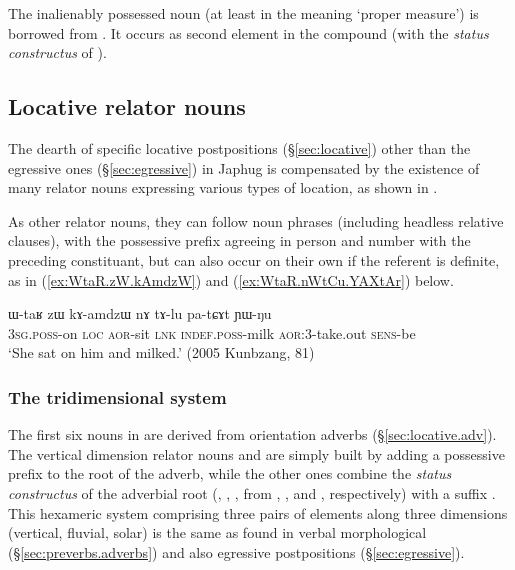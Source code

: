 The inalienably possessed noun   (at least in the meaning `proper measure') is borrowed from . It occurs as second element in the compound (with the \textit{status constructus}  of ).

\subsection{Locative relator nouns} \label{sec:relator.location}
The dearth of specific locative postpositions (§\ref{sec:locative}) other than the egressive ones (§\ref{sec:egressive}) in Japhug is compensated by the existence of many relator nouns expressing various types of location, as shown in . 

As other relator nouns, they can follow noun phrases (including headless relative clauses), with the possessive prefix agreeing in person and number with the preceding constituant, but can also occur on their own if the referent is definite, as  in (\ref{ex:WtaR.zW.kAmdzW}) and (\ref{ex:WtaR.nWtCu.YAXtAr}) below.

\begin{exe}
\ex \label{ex:WtaR.zW.kAmdzW}
\gll  ɯ-taʁ zɯ kɤ-amdzɯ nɤ tɤ-lu pa-tɕɤt ɲɯ-ŋu\\
\textsc{3sg}.\textsc{poss}-on \textsc{loc} \textsc{aor}-sit \textsc{lnk} \textsc{indef}.\textsc{poss}-milk \textsc{aor}:3\flobv{}-take.out \textsc{sens}-be\\
\glt `She sat on him and milked.' (2005 Kunbzang, 81)
\end{exe}

 

\subsubsection{The tridimensional system} \label{sec:relator.nouns.3d}
The first six nouns in  are derived from orientation adverbs (§\ref{sec:locative.adv}). The vertical dimension relator nouns  and  are simply built by adding a possessive prefix to the root of the adverb, while the other ones combine the \textit{status constructus} of the adverbial root (, , ,  from , ,  and , respectively) with a suffix . This hexameric system comprising three pairs of elements along three dimensions (vertical, fluvial, solar) is the same as found in verbal morphological (§\ref{sec:preverbs.adverbs}) and also egressive postpositions (§\ref{sec:egressive}).

